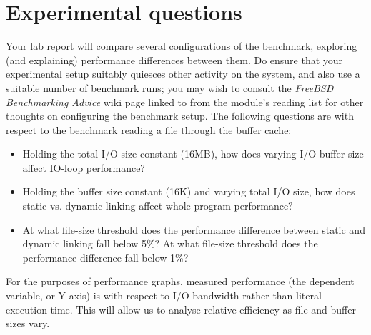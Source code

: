 \documentclass[a4paper,10pt]{article}
\begin{document}
\section*{Experimental questions}

Your lab report will compare several configurations of the benchmark,
exploring (and explaining) performance differences between them.
Do ensure that your experimental setup suitably quiesces other activity on the
system, and also use a suitable number of benchmark runs; you may wish to
consult the \textit{FreeBSD Benchmarking Advice} wiki page linked to from the
module's reading list for other thoughts on configuring the benchmark setup.
The following questions are with respect to the benchmark reading a file
through the buffer cache:

\begin{itemize}
  \item Holding the total I/O size constant (16MB), how does varying I/O
    buffer size affect IO-loop performance?
  \item Holding the buffer size constant (16K) and varying total I/O size, how
     does static vs. dynamic linking affect whole-program performance?
  \item At what file-size threshold does the performance difference between
    static and dynamic linking fall below 5\%?  At what file-size threshold
    does the performance difference fall below 1\%?
\end{itemize}

\noindent
For the purposes of performance graphs, measured performance (the dependent
variable, or Y axis) is with respect to I/O bandwidth rather than literal
execution time.
This will allow us to analyse relative efficiency as file and buffer sizes
vary.
\end{document}
